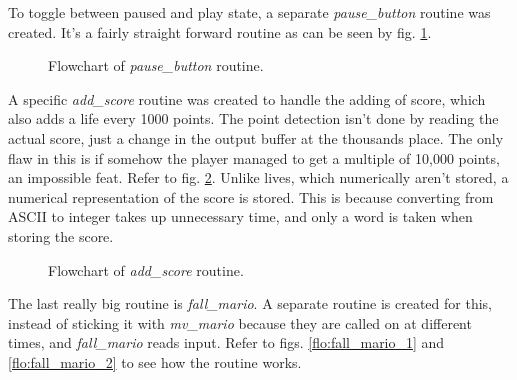 \documentclass[letterpaper,10pt]{article}
\begin{document}
    \begin{minipage}{\linewidth}
        
        \label{flo:mv_mario_1}
    \end{minipage}

    \begin{minipage}{\linewidth}
        
        \label{flo:mv_mario_2}
    \end{minipage}

    To toggle between paused and play state, a separate \textit{pause\_button}
    routine was created. It's a fairly straight forward routine as can be
    seen by fig. \ref{flo:pause_button}.

    \begin{figure}[hp]
        
        \caption{Flowchart of \textit{pause\_button} routine.}
        \label{flo:pause_button}
    \end{figure}

    A specific \textit{add\_score} routine was created to handle the adding of
    score, which also adds a life every 1000 points. The point detection isn't
    done by reading the actual score, just a change in the output buffer at the
    thousands place. The only flaw in this is if somehow the player managed to
    get a multiple of 10,000 points, an impossible feat. Refer to fig.
    \ref{flo:add_score}. Unlike lives, which numerically aren't stored, a
    numerical representation of the score is stored. This is because converting
    from ASCII to integer takes up unnecessary time, and only a word is taken
    when storing the score.

    \begin{figure}[hp]
        
        \caption{Flowchart of \textit{add\_score} routine.}
        \label{flo:add_score}
    \end{figure}

    The last really big routine is \textit{fall\_mario}. A separate routine is
    created for this, instead of sticking it with \textit{mv\_mario} because
    they are called on at different times, and \textit{fall\_mario} reads
    input. Refer to figs. \ref{flo:fall_mario_1} and \ref{flo:fall_mario_2}
    to see how the routine works.

    \begin{minipage}{\linewidth}
        
        \label{flo:fall_mario_1}
    \end{minipage}
\end{document}
